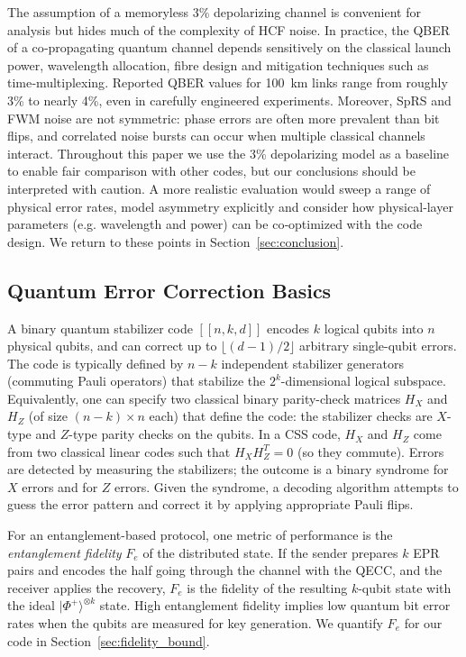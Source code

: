 \documentclass[conference]{IEEEtran}  %
\begin{document}
\begin{remark}
The assumption of a memoryless 3\% depolarizing channel is convenient for analysis but hides much of the complexity of HCF noise.  In practice, the QBER of a co‑propagating quantum channel depends sensitively on the classical launch power, wavelength allocation, fibre design and mitigation techniques such as time‑multiplexing\cite{Rahmouni2024}.  Reported QBER values for 100~km links range from roughly 3\% to nearly 4\%, even in carefully engineered experiments\cite{Kong2024}.  Moreover, SpRS and FWM noise are not symmetric: phase errors are often more prevalent than bit flips, and correlated noise bursts can occur when multiple classical channels interact.  Throughout this paper we use the 3\% depolarizing model as a baseline to enable fair comparison with other codes, but our conclusions should be interpreted with caution.  A more realistic evaluation would sweep a range of physical error rates, model asymmetry explicitly and consider how physical‑layer parameters (e.g. wavelength and power) can be co‑optimized with the code design.  We return to these points in Section~\ref{sec:conclusion}.
\end{remark}

\subsection{Quantum Error Correction Basics}
A binary quantum stabilizer code $[[n,k,d]]$ encodes $k$ logical qubits into $n$ physical qubits, and can correct up to $\lfloor (d-1)/2 \rfloor$ arbitrary single-qubit errors. The code is typically defined by $n-k$ independent stabilizer generators (commuting Pauli operators) that stabilize the $2^k$-dimensional logical subspace. Equivalently, one can specify two classical binary parity-check matrices $H_X$ and $H_Z$ (of size $(n-k)\times n$ each) that define the code: the stabilizer checks are $X$-type and $Z$-type parity checks on the qubits. In a CSS code, $H_X$ and $H_Z$ come from two classical linear codes such that $H_X H_Z^T = 0$ (so they commute). Errors are detected by measuring the stabilizers; the outcome is a binary syndrome for $X$ errors and for $Z$ errors. Given the syndrome, a decoding algorithm attempts to guess the error pattern and correct it by applying appropriate Pauli flips.

For an entanglement-based protocol, one metric of performance is the \emph{entanglement fidelity} $F_e$ of the distributed state. If the sender prepares $k$ EPR pairs and encodes the half going through the channel with the QECC, and the receiver applies the recovery, $F_e$ is the fidelity of the resulting $k$-qubit state with the ideal $|\Phi^+\rangle^{\otimes k}$ state. High entanglement fidelity implies low quantum bit error rates when the qubits are measured for key generation. We quantify $F_e$ for our code in Section~\ref{sec:fidelity_bound}.
\end{document}
